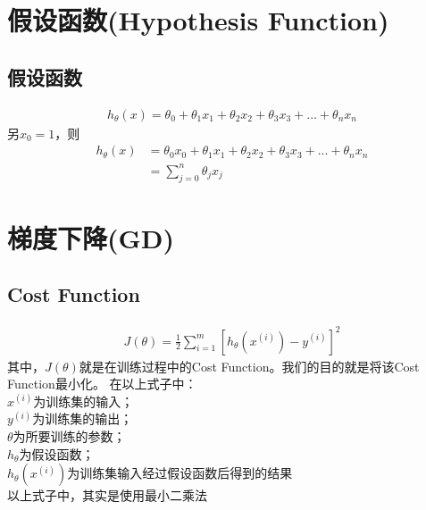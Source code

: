 \section{假设函数(Hypothesis Function)}
\subsection{假设函数}
\begin{equation}\begin{aligned}
	h_\theta(x) = \theta_0 + \theta_1x_1 + \theta_2x_2 + \theta_3x_3 + ... + \theta_nx_n
\end{aligned}\end{equation}
另$x_0=1$，则
\begin{equation}\begin{aligned}
	h_\theta(x) &= \theta_0x_0 + \theta_1x_1 + \theta_2x_2 + \theta_3x_3 + ... + \theta_nx_n \\
	&= \sum_{j=0}^n{\theta_jx_j}
\end{aligned}\end{equation}

\section{梯度下降(GD)}
\subsection{Cost Function}
\begin{equation}\begin{aligned}
	J(\theta) = \frac{1}{2} \sum_{i=1}^m \left[h_{\theta} {(x^{(i)})} - y^{(i)}\right]^2
\end{aligned}\end{equation}
其中，$J(\theta)$就是在训练过程中的Cost Function。我们的目的就是将该Cost Function最小化。
在以上式子中：\\
	$x^{(i)}$为训练集的输入；\\
	$y^{(i)}$为训练集的输出；\\
	$\theta$为所要训练的参数；\\
	$h_{\theta}$为假设函数；\\
	$h_{\theta} {(x^{(i)})}$为训练集输入经过假设函数后得到的结果\\
	以上式子中，其实是使用最小二乘法

